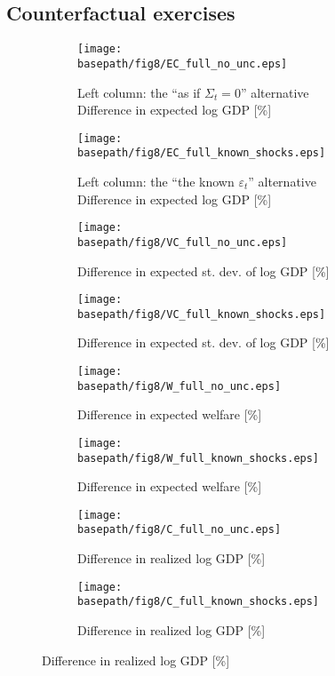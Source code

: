 \documentclass[11pt]{article}
\theoremstyle{definition}
\newcommand{\basepath}{F:/12004835/replication_package_final/replication_package_final/output_figures}
\begin{document}
	\subsection{Counterfactual exercises}
	\begin{figure}[ht]
		\caption{The role of uncertainty in the postwar period}
		\centering
		\begin{subfigure}[b]{0.48\textwidth} 
			\caption{Left column: the ``as if $\Sigma_t=0$'' alternative \\
			Difference in expected log GDP [\%]}
			\texttt{[image: \\basepath/fig8/EC\_full\_no\_unc.eps]}
			\label{fig:8-a}
		\end{subfigure}
		\hfill
		\begin{subfigure}[b]{0.48\textwidth}
			\caption{Left column: the ``the known $\varepsilon_t$'' alternative \\
				Difference in expected log GDP [\%]}
			\texttt{[image: \\basepath/fig8/EC\_full\_known\_shocks.eps]}
			\label{fig:8-b}
		\end{subfigure}
		
		\begin{subfigure}[b]{0.48\textwidth} 
			\caption{Difference in expected st. dev. of log GDP [\%]}
			\texttt{[image: \\basepath/fig8/VC\_full\_no\_unc.eps]}
			\label{fig:8-c}
		\end{subfigure}
		\hfill
		\begin{subfigure}[b]{0.48\textwidth}
			\caption{Difference in expected st. dev. of log GDP [\%]}
			\texttt{[image: \\basepath/fig8/VC\_full\_known\_shocks.eps]}
			\label{fig:8-d}
		\end{subfigure}
		
		\begin{subfigure}[b]{0.48\textwidth} 
			\caption{Difference in expected welfare [\%]}
			\texttt{[image: \\basepath/fig8/W\_full\_no\_unc.eps]}
			\label{fig:8-e}
		\end{subfigure}
		\hfill
		\begin{subfigure}[b]{0.48\textwidth}
			\caption{Difference in expected welfare [\%]}
			\texttt{[image: \\basepath/fig8/W\_full\_known\_shocks.eps]}
			\label{fig:8-f}
		\end{subfigure}
		
		\begin{subfigure}[b]{0.48\textwidth} 
			\caption{Difference in realized log GDP [\%]}
			\texttt{[image: \\basepath/fig8/C\_full\_no\_unc.eps]}
			\label{fig:8-g}
		\end{subfigure}
		\hfill
		\begin{subfigure}[b]{0.48\textwidth}
			\caption{Difference in realized log GDP [\%]}
			\texttt{[image: \\basepath/fig8/C\_full\_known\_shocks.eps]}
			\label{fig:8-h}
		\end{subfigure}
		
		\label{fig:8}
	\end{figure}
	
\end{document}
